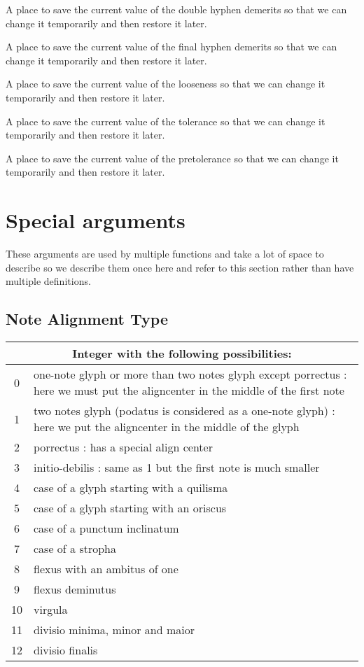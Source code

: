 A place to save the current value of the double hyphen demerits so that we can change it temporarily and then restore it later.

A place to save the current value of the final hyphen demerits so that we can change it temporarily and then restore it later.

A place to save the current value of the looseness so that we can change it temporarily and then restore it later.

A place to save the current value of the tolerance so that we can change it temporarily and then restore it later.

A place to save the current value of the pretolerance so that we can change it temporarily and then restore it later.



\section{Special arguments}

These arguments are used by multiple functions and take a lot of space
to describe so we describe them once here and refer to this section
rather than have multiple definitions.

\subsection{Note Alignment Type}\label{notesalign}
\begin{tabular}{cp{}}
  \multicolumn{2}{c}{Integer with the following possibilities:} \\
  \hline
  0 & one-note glyph or more than two notes glyph except porrectus : here we must put the aligncenter in the middle of the first note\\
  1 & two notes glyph (podatus is considered as a one-note glyph) : here we put the aligncenter in the middle of the glyph\\
  2 & porrectus : has a special align center\\
  3 & initio-debilis : same as 1 but the first note is much smaller\\
  4 & case of a glyph starting with a quilisma\\
  5 & case of a glyph starting with an oriscus\\
  6 & case of a punctum inclinatum\\
  7 & case of a stropha\\
  8 & flexus with an ambitus of one\\
  9 & flexus deminutus\\
  10 & virgula\\
  11 & divisio minima, minor and maior\\
  12 & divisio finalis
 \end{tabular}

